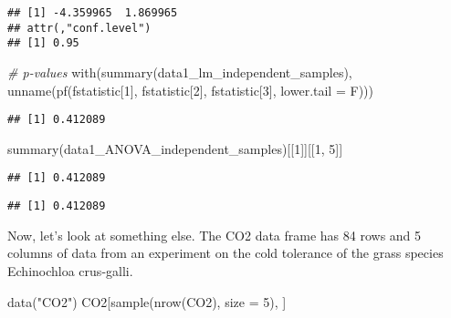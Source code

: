 \documentclass[
]{book}
\newenvironment{Shaded}{\begin{snugshade}}{\end{snugshade}}
\newcommand{\AttributeTok}[1]{\textcolor[rgb]{0.77,0.63,0.00}{#1}}
\newcommand{\CommentTok}[1]{\textcolor[rgb]{0.56,0.35,0.01}{\textit{#1}}}
\newcommand{\DecValTok}[1]{\textcolor[rgb]{0.00,0.00,0.81}{#1}}
\newcommand{\FunctionTok}[1]{\textcolor[rgb]{0.00,0.00,0.00}{#1}}
\newcommand{\NormalTok}[1]{#1}
\newcommand{\SpecialCharTok}[1]{\textcolor[rgb]{0.00,0.00,0.00}{#1}}
\newcommand{\StringTok}[1]{\textcolor[rgb]{0.31,0.60,0.02}{#1}}
\begin{document}
\begin{verbatim}
## [1] -4.359965  1.869965
## attr(,"conf.level")
## [1] 0.95
\end{verbatim}

\begin{Shaded}
\begin{Highlighting}[]
\CommentTok{\# p{-}values}
\FunctionTok{with}\NormalTok{(}\FunctionTok{summary}\NormalTok{(data1\_lm\_independent\_samples), }\FunctionTok{unname}\NormalTok{(}\FunctionTok{pf}\NormalTok{(fstatistic[}\DecValTok{1}\NormalTok{],}
\NormalTok{    fstatistic[}\DecValTok{2}\NormalTok{], fstatistic[}\DecValTok{3}\NormalTok{], }\AttributeTok{lower.tail =}\NormalTok{ F)))}
\end{Highlighting}
\end{Shaded}

\begin{verbatim}
## [1] 0.412089
\end{verbatim}

\begin{Shaded}
\begin{Highlighting}[]
\FunctionTok{summary}\NormalTok{(data1\_ANOVA\_independent\_samples)[[}\DecValTok{1}\NormalTok{]][[}\DecValTok{1}\NormalTok{, }\DecValTok{5}\NormalTok{]]}
\end{Highlighting}
\end{Shaded}

\begin{verbatim}
## [1] 0.412089
\end{verbatim}

\begin{Shaded}
\end{Shaded}

\begin{verbatim}
## [1] 0.412089
\end{verbatim}

Now, let's look at something else. The CO2 data frame has 84 rows and 5
columns of data from an experiment on the cold tolerance of the grass
species Echinochloa crus-galli.

\begin{Shaded}
\begin{Highlighting}[]
\FunctionTok{data}\NormalTok{(}\StringTok{"CO2"}\NormalTok{)}
\NormalTok{CO2[}\FunctionTok{sample}\NormalTok{(}\FunctionTok{nrow}\NormalTok{(CO2), }\AttributeTok{size =} \DecValTok{5}\NormalTok{), ]}
\end{Highlighting}
\end{Shaded}
\end{document}
